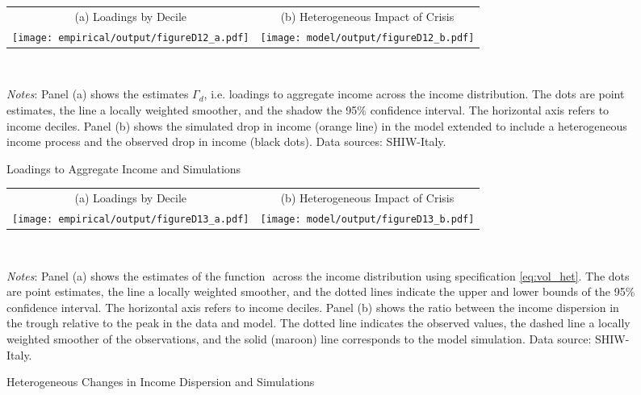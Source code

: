 \documentclass[12pt]{article}
\begin{document}
\begin{spacing}{1.5}
\begin{figure}[H]
\caption{Loadings to Aggregate Income and Simulations}
\label{fig:loadings_data}
\begin{tabular}{cc}
(a) Loadings by Decile  & (b) Heterogeneous Impact of Crisis  \vspace{.5em} \\
\texttt{[image: empirical/output/figureD12\_a.pdf]}
& \texttt{[image: model/output/figureD12\_b.pdf]} \\
\end{tabular}
\\ \raggedright{}\textit{\footnotesize{}Notes}{: \footnotesize{Panel (a) shows the estimates $\Gamma_d$, i.e. loadings to aggregate income across the income distribution. The dots are point estimates, the line a locally weighted smoother, and the shadow the 95\% confidence interval. The horizontal axis refers to income deciles. Panel (b) shows the simulated drop in income (orange line) in the model extended to include a heterogeneous income process and the observed drop in income (black dots). Data sources: SHIW-Italy.}}{\footnotesize\par}
\end{figure}

\begin{figure}[H]
\caption{Heterogeneous Changes in Income Dispersion  and Simulations}
\label{fig:loadings_data_unc}
\begin{tabular}{cc}
(a) Loadings by Decile  & (b) Heterogeneous Impact of Crisis  \vspace{.5em} \\
\texttt{[image: empirical/output/figureD13\_a.pdf]}
& \texttt{[image: model/output/figureD13\_b.pdf]} \\
\end{tabular}
\\ \raggedright{}\textit{\footnotesize{}Notes}{:  \footnotesize{Panel (a) shows the estimates of the function $\label{vol_het}$ across the income distribution using specification \eqref{eq:vol_het}. The dots are point estimates, the line a locally weighted smoother, and the dotted lines indicate the upper and lower bounds of the 95\% confidence interval. The horizontal axis refers to income deciles. Panel (b) shows the ratio between the income dispersion in the trough relative to the peak in the data and model. The dotted line indicates the observed values, the dashed line a locally weighted smoother of the observations, and the solid (maroon) line corresponds to the model simulation. Data source: SHIW-Italy.}}{\footnotesize\par}
\end{figure}



\end{spacing}
\end{document}
